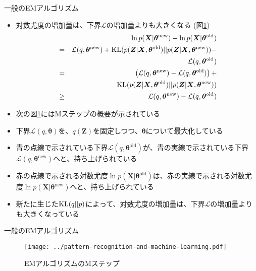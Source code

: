 \documentclass[dvipdfmx,notheorems,t]{beamer}
\begin{document}
\begin{frame}{一般のEMアルゴリズム}
\begin{itemize}
\begin{itemize}
		\item 対数尤度の増加量は、下界$\mathcal{L}$の増加量よりも大きくなる (図\ref{fig:em-algorithm-m-step})
		\begin{eqnarray}
			&& \ln p(\bm{X} | \bm{\theta}^\mathrm{new}) - \ln p(\bm{X} | \bm{\theta}^\mathrm{old}) \nonumber \\
			&=& \mathcal{L}(q, \bm{\theta}^\mathrm{new}) + \operatorname{KL} (p(\bm{Z} | \bm{X}, \bm{\theta}^\mathrm{old}) || p(\bm{Z} | \bm{X}, \bm{\theta}^\mathrm{new})) - \nonumber \\
			&& \qquad \mathcal{L}(q, \bm{\theta}^\mathrm{old}) \\
			&=& \left( \mathcal{L}(q, \bm{\theta}^\mathrm{new}) - \mathcal{L}(q, \bm{\theta}^\mathrm{old}) \right) + \nonumber \\
			&& \qquad \operatorname{KL} (p(\bm{Z} | \bm{X}, \bm{\theta}^\mathrm{old}) || p(\bm{Z} | \bm{X}, \bm{\theta}^\mathrm{new})) \\
			&\ge& \mathcal{L}(q, \bm{\theta}^\mathrm{new}) - \mathcal{L}(q, \bm{\theta}^\mathrm{old})
		\end{eqnarray}
		
		\item 次の図\ref{fig:em-algorithm-m-step}にはMステップの概要が示されている
		\newline
		\item 下界$\mathcal{L}(q, \bm{\theta})$を、$q(\bm{Z})$を固定しつつ、$\bm{\theta}$について最大化している
		\newline
		\item \color{blue}青の点線\normalcolor で示されている下界$\mathcal{L}(q, \bm{\theta}^\mathrm{old})$が、\color{blue}青の実線\normalcolor で示されている下界$\mathcal{L}(q, \bm{\theta}^\mathrm{new})$へと、持ち上げられている
		\item \color{red}赤の点線\normalcolor で示される対数尤度$\ln p(\bm{X} | \bm{\theta}^\mathrm{old})$は、\color{red}赤の実線\normalcolor で示される対数尤度$\ln p(\bm{X} | \bm{\theta}^\mathrm{new})$へと、持ち上げられている
		\newline
		\item 新たに生じた$\operatorname{KL} (q || p)$によって、対数尤度の増加量は、下界$\mathcal{L}$の増加量よりも大きくなっている
	\end{itemize}
\end{itemize}

\end{frame}

\begin{frame}{一般のEMアルゴリズム}

\begin{figure}[h]
	\centering
	\texttt{[image: ../pattern-recognition-and-machine-learning.pdf]}
	\caption{EMアルゴリズムのMステップ}
	\label{fig:em-algorithm-m-step}
\end{figure}

\end{frame}
\end{document}

